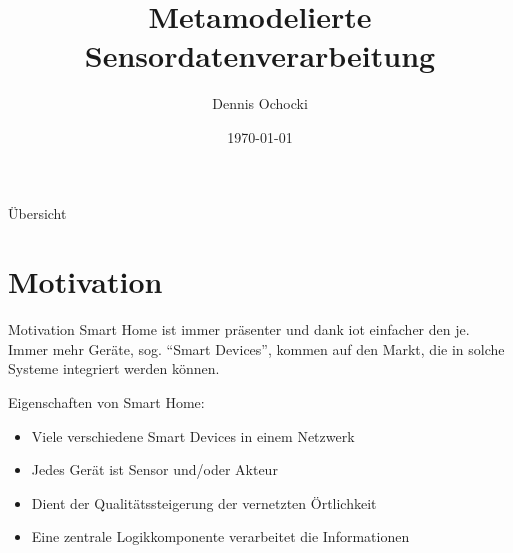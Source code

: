 \documentclass[12pt, pdf, xcolor={table, dvipsnames}, paperheight=8cm,paperwidth=12cm]{beamer}
\author{Dennis Ochocki}
\title[]{Metamodelierte Sensordatenverarbeitung}
\institute{}
\date{\today}
\begin{document}
	
\maketitle

\begin{frame}{Übersicht}
	\tableofcontents
\end{frame}

\section{Motivation}
\begin{frame}{Motivation}
	Smart Home ist immer präsenter und dank \gls{iot} einfacher den je. Immer mehr Geräte, sog. \enquote{Smart Devices}, kommen auf den Markt, die in solche Systeme integriert werden können. 
	
	\begin{block}{Eigenschaften von Smart Home:}
		\begin{itemize}
			\item Viele verschiedene Smart Devices in einem Netzwerk
			\item Jedes Gerät ist Sensor und/oder Akteur
			\item Dient der Qualitätssteigerung der vernetzten Örtlichkeit
			\item Eine zentrale Logikkomponente verarbeitet die Informationen
		\end{itemize}
	\end{block}
\end{frame}
\end{document}

